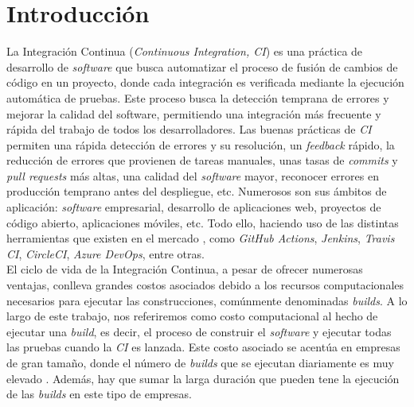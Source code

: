 \section{Introducción}
La Integración Continua (\textit{Continuous Integration, CI}) es una práctica de desarrollo de
\textit{software} que busca automatizar el proceso de fusión de cambios de código en un proyecto,
donde cada integración es verificada mediante la ejecución automática de pruebas. Este proceso
busca la detección temprana de errores y mejorar la calidad del software, permitiendo una
integración más frecuente y rápida del trabajo de todos los desarrolladores. Las buenas prácticas
de \textit{CI} \cite{9} permiten una rápida detección de errores y su resolución, un
\textit{feedback} rápido, la reducción de errores que provienen de tareas manuales, unas tasas de
\textit{commits} y \textit{pull requests} más altas, una calidad del \textit{software} mayor,
reconocer errores en producción temprano antes del despliegue, etc. Numerosos son sus ámbitos
de aplicación: \textit{software} empresarial, desarrollo de aplicaciones web, proyectos de código
abierto, aplicaciones móviles, etc. Todo ello, haciendo uso de las distintas herramientas que
existen en el mercado \cite{10}, como \textit{GitHub Actions}, \textit{Jenkins},
\textit{Travis CI}, \textit{CircleCI}, \textit{Azure DevOps}, entre otras.\\

El ciclo de vida de la Integración Continua, a pesar de ofrecer numerosas ventajas, conlleva
grandes costos asociados debido a los recursos computacionales \cite{11} necesarios para ejecutar
las construcciones, comúnmente denominadas \textit{builds}. A lo largo de este trabajo,
nos referiremos como costo computacional al hecho de ejecutar una \textit{build}, es decir, el
proceso de construir el \textit{software} y ejecutar todas las pruebas cuando la \textit{CI} es
lanzada. Este costo asociado se acentúa en empresas de gran tamaño, donde el número de
\textit{builds} que se ejecutan diariamente es muy elevado \cite{12,13}. Además, hay que sumar
la larga duración que pueden tene la ejecución de las \textit{builds} en este tipo de empresas.\\

